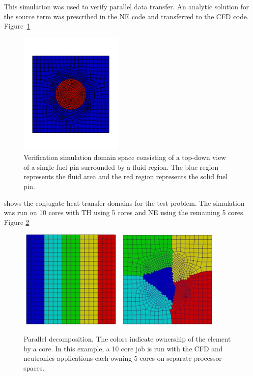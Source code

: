 \documentclass{mc2013}
\begin{document}
This simulation was used to verify parallel data transfer.  An
analytic solution for the source term was prescribed in the NE code
and transferred to the CFD code.  Figure~\ref{fig:domain}
\begin{figure}[ht!]
  \centering \includegraphics[width=2.0in]{cht_domains.png}
  \caption{Verification simulation domain space consisting of a
    top-down view of a single fuel pin surrounded by a fluid
    region. The blue region represents the fluid area and the red
    region represents the solid fuel pin.}
  \label{fig:domain}
\end{figure}
shows the conjugate heat transfer domains for the test problem.  The
simulation was run on 10 cores with TH using 5 cores and NE using the
remaining 5 cores.  Figure \ref{fig:parallel_decomposition}
\begin{figure}[ht!]
  \centering
  \includegraphics[width=2.0in]{neutronics_parallel_decomp.png}
  \includegraphics[width=2.0in]{cfd_parallel_decomp.png}
  \caption{Parallel decomposition.  The colors indicate ownership of
    the element by a core.  In this example, a 10 core job is run with
    the CFD and neutronics applications each owning 5 cores on
    separate processor spaces.}
  \label{fig:parallel_decomposition}
\end{figure}
\end{document}
